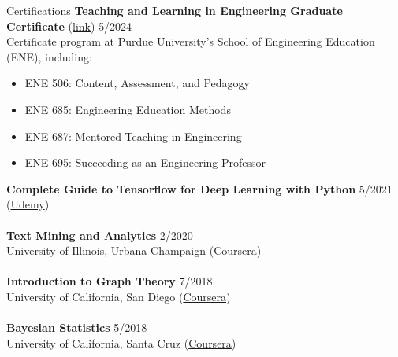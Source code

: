 \documentclass{CV} %
\begin{document}
\begin{rSection}{Certifications}
    \textbf{Teaching and Learning in Engineering Graduate Certificate} (\href{https://purdue0-my.sharepoint.com/:b:/g/personal/verma99_purdue_edu/EUn4CxYfteZMr_QELx--EhABcd8cPmzRR20d9nU_2e3Eig?e=LVcgBt}{link}) \hfill{5/2024}
    \\ Certificate program at Purdue University's School of Engineering Education (ENE), including:
    \begin{itemize}
        \item ENE 506: Content, Assessment, and Pedagogy
        \item ENE 685: Engineering Education Methods
        \item ENE 687: Mentored Teaching in Engineering
        \item ENE 695: Succeeding as an Engineering Professor
    \end{itemize}
    \textbf{Complete Guide to Tensorflow for Deep Learning with Python} \hfill 5/2021
    \\ (\href{https://www.udemy.com/certificate/UC-caa1f4ed-6be6-4b50-9bd1-1b57ab7c196a}{Udemy}) \\
    \\ \textbf{Text Mining and Analytics} \hfill 2/2020
    \\ University of Illinois, Urbana-Champaign (\href{https://coursera.org/share/7eac25e880771bf576b661324a4d79be}{Coursera}) \\
    \\ \textbf{Introduction to Graph Theory} \hfill 7/2018
    \\ University of California, San Diego (\href{https://coursera.org/share/97583460aa0510f570f971844f19d16b}{Coursera}) \\
    \\ \textbf{Bayesian Statistics} \hfill 5/2018
    \\ University of California, Santa Cruz (\href{https://coursera.org/share/8d0b0387400c53f13a7ce2b2b81153fc}{Coursera}) 
\end{rSection}
\end{document}
